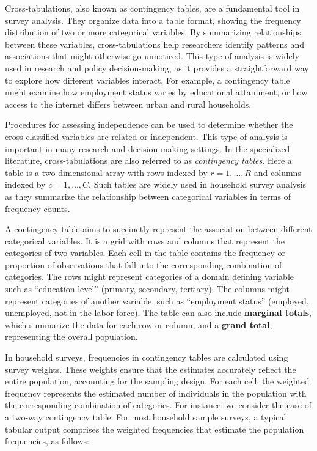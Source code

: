 \documentclass[
  12pt,
]{book}
\begin{document}
Cross-tabulations, also known as contingency tables, are a fundamental tool in survey analysis. They organize data into a table format, showing the frequency distribution of two or more categorical variables. By summarizing relationships between these variables, cross-tabulations help researchers identify patterns and associations that might otherwise go unnoticed. This type of analysis is widely used in research and policy decision-making, as it provides a straightforward way to explore how different variables interact. For example, a contingency table might examine how employment status varies by educational attainment, or how access to the internet differs between urban and rural households.

Procedures for assessing independence can be used to determine whether the cross-classified variables are related or independent. This type of analysis is important in many research and decision-making settings. In the specialized literature, cross-tabulations are also referred to as \emph{contingency tables}. Here a table is a two-dimensional array with rows indexed by \(r=1, \ldots, R\) and columns indexed by \(c=1, \ldots, C\). Such tables are widely used in household survey analysis as they summarize the relationship between categorical variables in terms of frequency counts.

A contingency table aims to succinctly represent the association between different categorical variables. It is a grid with rows and columns that represent the categories of two variables. Each cell in the table contains the frequency or proportion of observations that fall into the corresponding combination of categories. The rows might represent categories of a domain defining variable such as ``education level'' (primary, secondary, tertiary). The columns might represent categories of another variable, such as ``employment status'' (employed, unemployed, not in the labor force). The table can also include \textbf{marginal totals}, which summarize the data for each row or column, and a \textbf{grand total}, representing the overall population.

In household surveys, frequencies in contingency tables are calculated using survey weights. These weights ensure that the estimates accurately reflect the entire population, accounting for the sampling design. For each cell, the weighted frequency represents the estimated number of individuals in the population with the corresponding combination of categories. For instance: we consider the case of a two-way contingency table. For most household sample surveys, a typical tabular output comprises the weighted frequencies that estimate the population frequencies, as follows:
\end{document}
